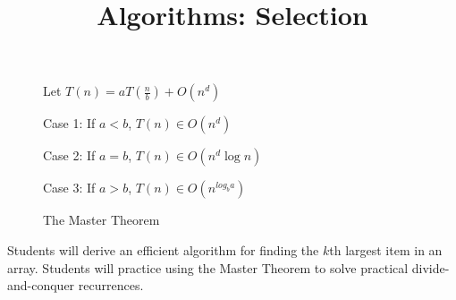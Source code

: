 \documentclass{tufte-handout}
\title{Algorithms: Selection}
\date{}
\begin{document}
\maketitle

\begin{figure}
\caption{The Master Theorem}
Let $T(n) = a T(\frac{n}{b}) + O(n^d)$ 

Case 1: If $a < b$, $T(n) \in O(n^d)$

Case 2: If $a = b$, $T(n) \in O(n^d \log n)$

Case 3: If $a > b$, $T(n) \in O(n^{log_b a})$
\end{figure}

\begin{objective}
  Students will derive an efficient algorithm for finding the $k$th largest item in an array. Students will practice using the Master Theorem to solve practical divide-and-conquer recurrences.
\end{objective}
\end{document}
